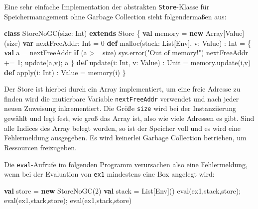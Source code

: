 \documentclass[]{article}
\newenvironment{Shaded}{}{}
\newcommand{\DecValTok}[1]{\textcolor[rgb]{0.25,0.63,0.44}{#1}}
\newcommand{\FunctionTok}[1]{\textcolor[rgb]{0.02,0.16,0.49}{#1}}
\newcommand{\KeywordTok}[1]{\textcolor[rgb]{0.00,0.44,0.13}{\textbf{#1}}}
\newcommand{\NormalTok}[1]{#1}
\newcommand{\StringTok}[1]{\textcolor[rgb]{0.25,0.44,0.63}{#1}}
\begin{document}
Eine sehr einfache Implementation der abstrakten \texttt{Store}-Klasse
für Speichermanagement ohne Garbage Collection sieht folgendermaßen aus:

\begin{Shaded}
\begin{Highlighting}[]
\KeywordTok{class} \FunctionTok{StoreNoGC}\NormalTok{(size: Int) }\KeywordTok{extends}\NormalTok{ Store \{}
  \KeywordTok{val}\NormalTok{ memory = }\KeywordTok{new}\NormalTok{ Array[Value](size)}
  \KeywordTok{var}\NormalTok{ nextFreeAddr: Int = }\DecValTok{0}
  \KeywordTok{def} \FunctionTok{malloc}\NormalTok{(stack: List[Env], v: Value) : Int = \{}
    \KeywordTok{val}\NormalTok{ a = nextFreeAddr}
    \KeywordTok{if}\NormalTok{ (a \textgreater{}= size) sys.}\FunctionTok{error}\NormalTok{(}\StringTok{"Out of memory!"}\NormalTok{)}
\NormalTok{    nextFreeAddr += }\DecValTok{1}\NormalTok{; }\FunctionTok{update}\NormalTok{(a,v); a}
\NormalTok{  \}}
  \KeywordTok{def} \FunctionTok{update}\NormalTok{(i: Int, v: Value) : Unit = memory.}\FunctionTok{update}\NormalTok{(i,v)}
  \KeywordTok{def} \FunctionTok{apply}\NormalTok{(i: Int) : Value = }\FunctionTok{memory}\NormalTok{(i)}
\NormalTok{\}}
\end{Highlighting}
\end{Shaded}

Der Store ist hierbei durch ein Array implementiert, um eine freie
Adresse zu finden wird die mutierbare Variable \texttt{nextFreeAddr}
verwendet und nach jeder neuen Zuweisung inkrementiert. Die Größe
\texttt{size} wird bei der Instanziierung gewählt und legt fest, wie
groß das Array ist, also wie viele Adressen es gibt. Sind alle Indices
des Array belegt worden, so ist der Speicher voll und es wird eine
Fehlermeldung ausgegeben. Es wird keinerlei Garbage Collection
betrieben, um Ressourcen freizugeben.

Die \texttt{eval}-Aufrufe im folgenden Programm verursachen also eine
Fehlermeldung, wenn bei der Evaluation von \texttt{ex1} mindestens eine
Box angelegt wird:

\begin{Shaded}
\begin{Highlighting}[]
\KeywordTok{val}\NormalTok{ store = }\KeywordTok{new} \FunctionTok{StoreNoGC}\NormalTok{(}\DecValTok{2}\NormalTok{)}
\KeywordTok{val}\NormalTok{ stack = List[Env]()}
\FunctionTok{eval}\NormalTok{(ex1,stack,store); }\FunctionTok{eval}\NormalTok{(ex1,stack,store); }\FunctionTok{eval}\NormalTok{(ex1,stack,store)}
\end{Highlighting}
\end{Shaded}
\end{document}
